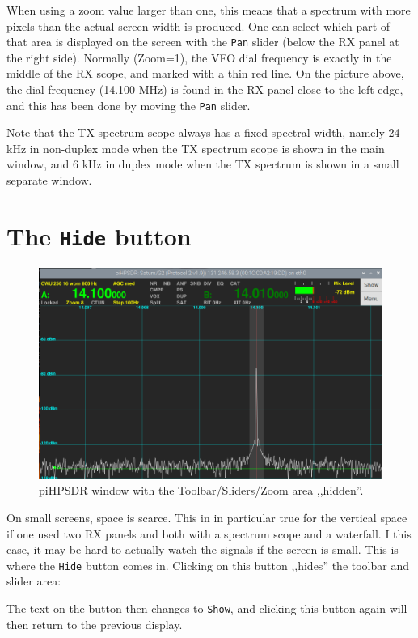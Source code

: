 \documentclass[12pt]{book}
\def\rett#1{\texttt{\color{red}#1}}
\begin{document}
When using a zoom value larger than one, this means that
a spectrum with more pixels than the actual screen width
is produced. One can select which part of that area
is displayed on the screen with the \rett{Pan} slider
(below the RX panel at the right side). Normally (Zoom=1),
the VFO dial frequency is exactly in the middle of the
RX scope, and marked with a thin red line. On the picture
above, the dial frequency (14.100 MHz) is found in the RX
panel close to the left edge, and this has been done
by moving the \rett{Pan} slider.

Note that the TX spectrum scope always has a fixed spectral
width, namely 24 kHz in non-duplex mode when the TX spectrum
scope is shown in the main window, and 6 kHz in duplex mode
when the TX spectrum is shown in a small separate window.

\section{The \texttt{Hide} button}
\begin{figure}[ht]
\center
\includegraphics[width=12cm]{Hidden.png}
\caption{piHPSDR window with the Toolbar/Sliders/Zoom
area ,,hidden''.}
\end{figure}

On small screens, space is scarce. This in in particular true
for the vertical space if one used two RX panels and both
with a spectrum scope and a waterfall. I this case, it may be
hard to actually watch the signals if the screen is small.
This is where the \rett{Hide} button comes in. Clicking on
this button ,,hides'' the toolbar and slider area:


The text on the button then changes to \rett{Show}, and
clicking this button again will then return to the
previous display.
\end{document}

